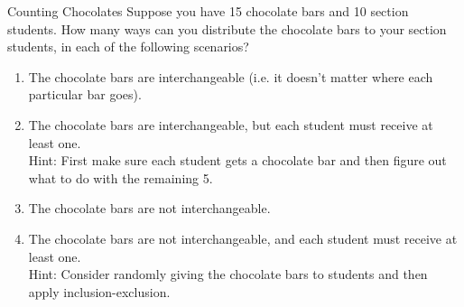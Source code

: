 \documentclass[11pt]{article}
\begin{document}
\begin{exercise}{Counting Chocolates}
Suppose you have 15 chocolate bars and 10 section students. How many ways can you distribute the chocolate bars to your section students, in each of the following scenarios? 
\begin{enumerate}
    \item The chocolate bars are interchangeable (i.e. it doesn't matter where 
    each particular bar goes).
    \item The chocolate bars are interchangeable, but each student must receive 
    at least one. \\
    Hint: First make sure each student gets a chocolate bar and then figure out
    what to do with the remaining 5. 
    \item The chocolate bars are not interchangeable.
    \item The chocolate bars are not interchangeable, and each student must 
    receive at least one. \\
    Hint: Consider randomly giving the chocolate bars to students and then 
    apply inclusion-exclusion.
\end{enumerate}
\end{exercise}
\end{document}
